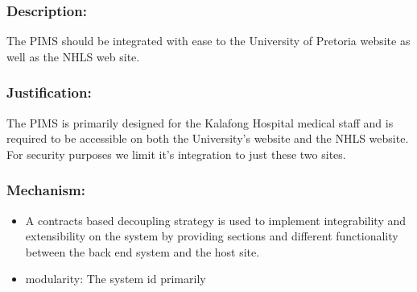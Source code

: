 \subsubsection*{Description:}
	  The PIMS should be integrated with ease to the University of Pretoria website as well as the NHLS web site.
\subsubsection*{Justification:}
	   The PIMS is primarily designed for the Kalafong Hospital medical staff and is required to be accessible on both the University's website and the NHLS website. For security purposes we limit it's integration to just these two sites.
\subsubsection*{Mechanism:}
	\begin{itemize}
		\item A contracts based decoupling strategy is used to implement integrability and extensibility on the system by providing sections and different functionality between the back end system and the host site. 
		\item modularity: The system id primarily 
	\end{itemize}